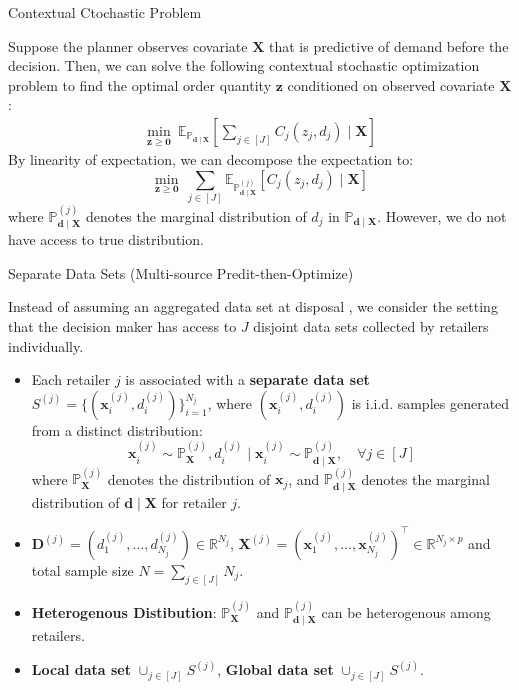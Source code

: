 \documentclass{beamer}
\newcommand{\mb}[1]{{\mathbf{#1}}}
\newcommand{\txrd}[1]{{\textcolor{sintefred}{\textbf{#1}}}}
\newcommand{\bbp}{\mathbb{P}}
\newcommand{\bbr}{\mathbb{R}}
\begin{document}
\begin{frame}{Contextual Ctochastic Problem}

Suppose the planner observes covariate $\mb X$ that is predictive of demand before the decision. Then, we can solve the following contextual stochastic optimization problem to find the optimal order quantity $\bm z$ conditioned on observed covariate $\mb X$ \citep{Ban_Rudin_2019big}: 
{\large
\begin{align}
\min_{\bm z \geq \bm 0} \  \mathbb{E}_{\bbp_{\bm d \mid \mb X}} \left[\sum_{j \in [J]}   C_j (z_j,  d_j)  \mid \mb X \right] 
\label{problem: contextual stochastic optimization}
\end{align}
}
\vspace{0.3cm}
By linearity of expectation, we can decompose the expectation to:
{\large
\[
\min_{\bm z \geq \bm 0} \ \sum_{j \in [J]} \mathbb{E}_{\bbp^{(j)}_{\bm d \mid \mb X}} \left[  C_j (z_j,  d_j)  \mid \mb X \right]
\]
}
where $ {\bbp^{(j)}_{\bm d \mid \mb X}}$ denotes the marginal distribution of $d_j$ in $\bbp_{\bm d \mid \mb X}$. However, we do not have access to true distribution.

\end{frame}



\begin{frame}{Separate Data Sets (Multi-source Predit-then-Optimize)}

Instead of assuming an aggregated data set at disposal \citep{notz2022prescriptive}, we consider the setting that the decision maker has access to $J$ \alert{disjoint data sets collected by retailers individually}.

\begin{itemize}
    \item Each retailer $j$ is associated with a \txrd{separate data set} $S^{(j)}=\{({\bm x}_i^{(j)},{d}_i^{(j)})\}_{i = 1}^{N_j}$, where $({\bm x}_i^{(j)},{ d}_i^{(j)})$ is i.i.d. samples generated from a distinct distribution:
    {\large
    \[
    {\bm x}_i^{(j)} \sim \bbp^{(j)}_{\mb X}, { d}_i^{(j)} \mid {\bm x}_i^{(j)} \sim \bbp^{(j)}_{\bm d \mid \mb X}, \quad \forall j \in [J]
    \]
    }
    where $\bbp^{(j)}_{\mb X}$ denotes the distribution of $\bm x_j$, and $\bbp^{(j)}_{\bm d \mid \mb X}$ denotes the marginal distribution of ${\bm d \mid \mb X}$ for retailer $j$.
    \item $\mb D^{(j)} = ({ d}_{1}^{(j)}, \ldots, { d}_{N_j}^{(j)}) \in \bbr^{N_j}$, $\mb X^{(j)} = ({\bm x}_{1}^{(j)}, \ldots, {\bm x}_{N_j}^{(j)})^\top \in \bbr^{N_j \times p} $ and total sample size $N = \sum_{j \in [J]} N_j$.
    \item \txrd{Heterogenous Distibution}: $\bbp^{(j)}_{\mb X}$ and $\bbp^{(j)}_{\bm d \mid \mb X}$  can be heterogenous among retailers.
    \item \txrd{Local data set} $\cup_{j \in [J]} S^{(j)}$, \txrd{Global data set} $\cup_{j \in [J]} S^{(j)}$.
    \end{itemize}

\end{frame}
\end{document}
